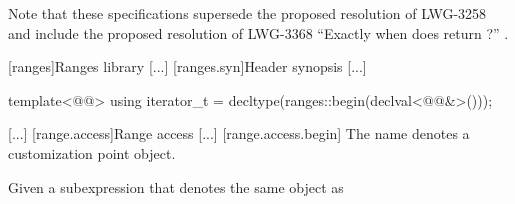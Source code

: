 Note that these specifications supersede the proposed resolution of LWG-3258
and include the proposed resolution of
LWG-3368 ``Exactly when does  return ?'' \cite{lwg3368}.

\setcounter{chapter}{23}
[ranges]{Ranges library}
[...]
\setcounter{section}{1}
[ranges.syn]{Header  synopsis}
[...]
\begin{codeblock}
  template<@@>
    using iterator_t = decltype(ranges::begin(declval<@@&>()));
\end{codeblock}
[...]
[range.access]{Range access}
[...]
[range.access.begin]{}
\pnum
The name  denotes a customization point
object.

\pnum
Given a subexpression  
  that denotes the same object as \removed{,}

